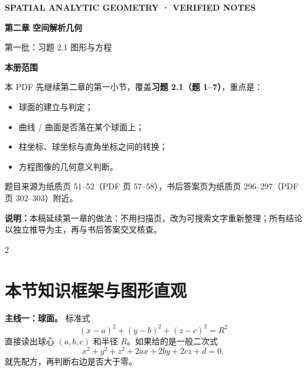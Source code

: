 \documentclass[UTF8,a4paper,11pt,fontset=none]{ctexart}
\newcommand{\tip}[1]{\begin{tcolorbox}[colback=light,colframe=rulegray,boxrule=0.4pt,arc=1.5mm,left=3mm,right=3mm,top=2mm,bottom=2mm]#1\end{tcolorbox}}
\begin{document}
\thispagestyle{empty}
\vspace*{18mm}
{\sffamily\large\color{teal}\bfseries SPATIAL ANALYTIC GEOMETRY · VERIFIED NOTES}\par
\vspace{8mm}
{\sffamily\fontsize{28}{36}\selectfont\bfseries\color{navy} 第二章 空间解析几何}\par
\vspace{3mm}
{\sffamily\fontsize{20}{30}\selectfont\color{blue} 第一批：习题 2.1 \enspace 图形与方程}\par
\vspace{12mm}
\begin{tcolorbox}[colback=light,colframe=rulegray,arc=2mm,boxrule=0.6pt,left=5mm,right=5mm,top=5mm,bottom=5mm]
\large\textbf{本册范围}\par\medskip
\normalsize
本 PDF 先继续第二章的第一小节，覆盖\textbf{习题 2.1（题 1--7）}，重点是：
\begin{itemize}
\item 球面的建立与判定；
\item 曲线 / 曲面是否落在某个球面上；
\item 柱坐标、球坐标与直角坐标之间的转换；
\item 方程图像的几何意义判断。
\end{itemize}
题目来源为纸质页 51--52（PDF 页 57--58），书后答案页为纸质页 296--297（PDF 页 302--303）附近。
\end{tcolorbox}
\vfill
{\small\noindent\textbf{说明：}本稿延续第一章的做法：不用扫描页，改为可搜索文字重新整理；所有结论以独立推导为主，再与书后答案交叉核查。}\par
\clearpage
\begin{multicols}{2}
\footnotesize\setlength{\parskip}{0pt}\tableofcontents
\end{multicols}
\clearpage

\section*{本节知识框架与图形直观}
\tip{\textbf{主线一：球面。} 标准式
\[
(x-a)^2+(y-b)^2+(z-c)^2=R^2
\]
直接读出球心 $(a,b,c)$ 和半径 $R$。如果给的是一般二次式
\[
 x^2+y^2+z^2+2ax+2by+2cz+d=0,
\]
就先配方，再判断右边是否大于零。}
\end{document}
